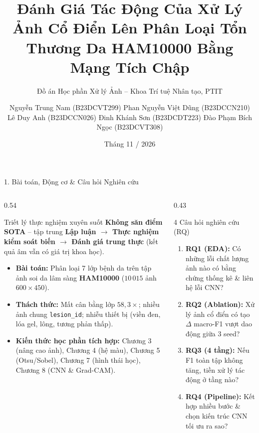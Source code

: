 \documentclass[aspectratio=169,10pt]{beamer}
\title[Xử lý ảnh \& CNN trên HAM10000]{\textbf{Đánh Giá Tác Động Của Xử Lý Ảnh Cổ Điển Lên Phân Loại Tổn Thương Da HAM10000 Bằng Mạng Tích Chập}}
\subtitle{Đồ án Học phần Xử lý Ảnh -- Khoa Trí tuệ Nhân tạo, PTIT}
\author[Nhóm Đồ án XLA]{\small Nguyễn Trung Nam (B23DCVT299) \quad Phan Nguyễn Việt Dũng (B23DCCN210)\\[2pt] Lê Duy Anh (B23DCCN026) \quad Đinh Khánh Sơn (B23DCDT223) \quad Đào Phạm Bích Ngọc (B23DCVT308)}
\institute[PTIT]{Học viện Công nghệ Bưu chính Viễn thông}
\date{Tháng 11 / 2026}
\begin{document}
\begin{frame}
\titlepage
\end{frame}

\begin{frame}{1. Bài toán, Động cơ \& Câu hỏi Nghiên cứu}
\begin{columns}[T,onlytextwidth]
\begin{column}{0.54\textwidth}
\begin{block}{Triết lý thực nghiệm xuyên suốt}
\textbf{Không săn điểm SOTA} -- tập trung \textbf{Lập luận $\rightarrow$ Thực nghiệm kiểm soát biến $\rightarrow$ Đánh giá trung thực} (kết quả âm vẫn có giá trị khoa học).
\end{block}
\vspace{2pt}
\begin{itemize}
    \item \textbf{Bài toán:} Phân loại 7 lớp bệnh da trên tập ảnh soi da lâm sàng \textbf{HAM10000} ($10\,015$ ảnh $600{\times}450$).
    \item \textbf{Thách thức:} Mất cân bằng lớp $58{,}3\times$; nhiều ảnh chung \texttt{lesion\_id}; nhiễu thiết bị (viền đen, lóa gel, lông, tương phản thấp).
    \item \textbf{Kiến thức học phần tích hợp:} Chương 3 (nâng cao ảnh), Chương 4 (hệ màu), Chương 5 (Otsu/Sobel), Chương 7 (hình thái học), Chương 8 (CNN \& Grad-CAM).
\end{itemize}
\end{column}
\begin{column}{0.43\textwidth}
\begin{block}{4 Câu hỏi nghiên cứu (RQ)}
\footnotesize
\begin{enumerate}
    \item \textbf{RQ1 (EDA):} Có những lỗi chất lượng ảnh nào có bằng chứng thống kê \& liên hệ lỗi CNN?
    \item \textbf{RQ2 (Ablation):} Xử lý ảnh cổ điển có tạo $\Delta$ macro-F1 vượt dao động giữa 3 seed?
    \item \textbf{RQ3 (4 tầng):} Nếu F1 toàn tập không tăng, tiền xử lý tác động ở tầng nào?
    \item \textbf{RQ4 (Pipeline):} Kết hợp nhiều bước \& chọn kiến trúc CNN tối ưu ra sao?
\end{enumerate}
\end{block}
\end{column}
\end{columns}
\end{frame}
\end{document}
